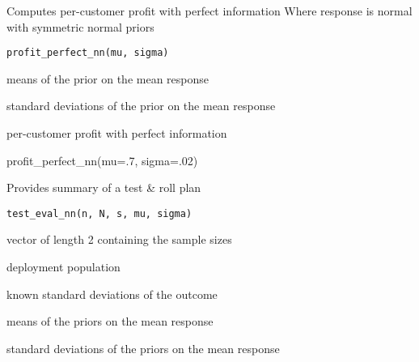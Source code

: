 \documentclass[a4paper]{book}
\begin{document}
%
\begin{Description}\relax
Computes per-customer profit with perfect information
Where response is normal with symmetric normal priors
\end{Description}
%
\begin{Usage}
\begin{verbatim}
profit_perfect_nn(mu, sigma)
\end{verbatim}
\end{Usage}
%
\begin{Arguments}
\begin{ldescription}
\item[\code{mu}] means of the prior on the mean response

\item[\code{sigma}] standard deviations of the prior on the mean response
\end{ldescription}
\end{Arguments}
%
\begin{Value}
per-customer profit with perfect information
\end{Value}
%
\begin{Examples}
\begin{ExampleCode}
profit_perfect_nn(mu=.7, sigma=.02)
\end{ExampleCode}
\end{Examples}
%
\begin{Description}\relax
Provides summary of a test \& roll plan
\end{Description}
%
\begin{Usage}
\begin{verbatim}
test_eval_nn(n, N, s, mu, sigma)
\end{verbatim}
\end{Usage}
%
\begin{Arguments}
\begin{ldescription}
\item[\code{n}] vector of length 2 containing the sample sizes

\item[\code{N}] deployment population

\item[\code{s}] known standard deviations of the outcome

\item[\code{mu}] means of the priors on the mean response

\item[\code{sigma}] standard deviations of the priors on the mean response
\end{ldescription}
\end{Arguments}
\end{document}
